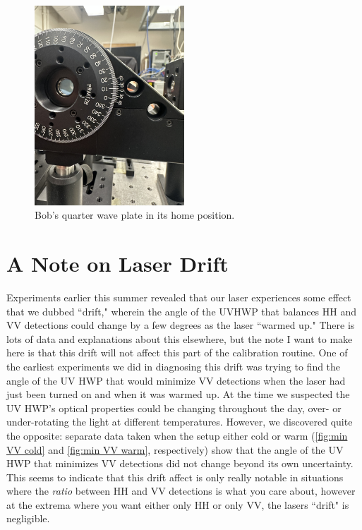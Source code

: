 \documentclass{paper}[11pt]
\begin{document}
	\begin{figure}[hp]
		\centering
		\includegraphics[angle=-90, origin=c, width=0.5\textwidth]{figures/BQWP_HOME.JPG}
		\caption{Bob's quarter wave plate in its home position.}
		\label{fig:BQWP home}
	\end{figure}
	
	\section{A Note on Laser Drift}
	Experiments earlier this summer revealed that our laser experiences some effect that we dubbed ``drift," wherein the angle of the UVHWP that balances HH and VV detections could change by a few degrees as the laser ``warmed up." There is lots of data and explanations about this elsewhere, but the note I want to make here is that this drift will not affect this part of the calibration routine. One of the earliest experiments we did in diagnosing this drift was trying to find the angle of the UV HWP that would minimize VV detections when the laser had just been turned on and when it was warmed up. At the time we suspected the UV HWP's optical properties could be changing throughout the day, over- or under-rotating the light at different temperatures. However, we discovered quite the opposite: separate data taken when the setup either cold or warm (\cref{fig:min VV cold} and \cref{fig:min VV warm}, respectively) show that the angle of the UV HWP that minimizes VV detections did not change beyond its own uncertainty. This seems to indicate that this drift affect is only really notable in situations where the \textit{ratio} between HH and VV detections is what you care about, however at the extrema where you want either only HH or only VV, the lasers ``drift" is negligible.
	
\end{document}
